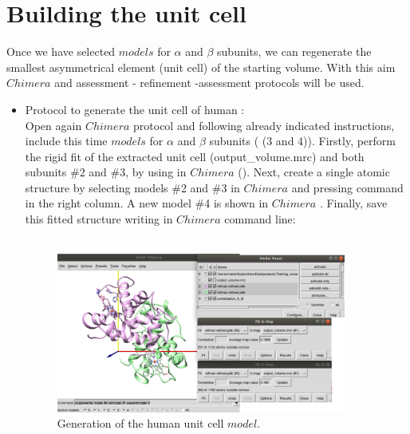 
\section{Building the unit cell}

Once we have selected $models$ for  $\alpha$ and $\beta$ subunits, we can regenerate the smallest asymmetrical element (unit cell) of the starting volume. With this aim $Chimera$  and assessment - refinement -assessment protocols will be used.\\ 

\begin{itemize}
 \item Protocol  to generate the unit cell of human :\\
 
    Open again $Chimera$  protocol and following already indicated instructions, include this time $models$ for  $\alpha$ and $\beta$ subunits ( (3 and 4)). Firstly, perform the rigid fit of the extracted unit cell (output\_volume.mrc) and both subunits \#2 and \#3, by using  in $Chimera$ (). Next, create a single atomic structure by selecting models \#2 and \#3 in $Chimera$  and pressing  command in the right column. A new model \#4 is shown in $Chimera$ . Finally, save this fitted structure writing in $Chimera$ command line:\\
    \\
    
    \begin{figure}[H]
    \centering 
    \captionsetup{width=.7\linewidth} 
    \includegraphics[width=0.90\textwidth]{Images/Fig40}
    \caption{Generation of the human  unit cell $model$.}
    \label{fig:chimera_rigid_fit_A_B}
   \end{figure}
    

\end{itemize}

